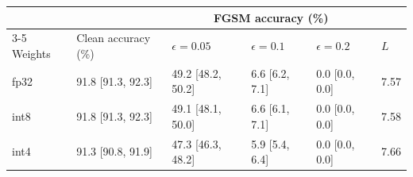 \begin{tabular}{llllll}
\toprule
 & & \multicolumn{3}{c}{FGSM accuracy (\%)} & \\
\cmidrule(lr){3-5}
Weights & Clean accuracy (\%) & $\epsilon = 0.05$ & $\epsilon = 0.1$ & $\epsilon = 0.2$ & $L$ \\
\midrule
fp32 & 91.8 [91.3, 92.3] & 49.2 [48.2, 50.2] & 6.6 [6.2, 7.1] & 0.0 [0.0, 0.0] & 7.57 \\
int8 & 91.8 [91.3, 92.3] & 49.1 [48.1, 50.0] & 6.6 [6.1, 7.1] & 0.0 [0.0, 0.0] & 7.58 \\
int4 & 91.3 [90.8, 91.9] & 47.3 [46.3, 48.2] & 5.9 [5.4, 6.4] & 0.0 [0.0, 0.0] & 7.66 \\
\bottomrule
\end{tabular}
